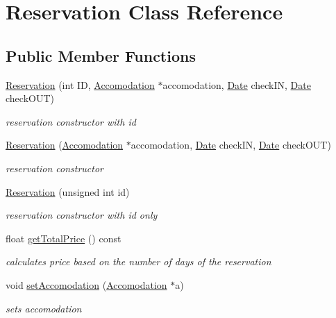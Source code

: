 \hypertarget{class_reservation}{}\section{Reservation Class Reference}
\label{class_reservation}
\subsection*{Public Member Functions}
\begin{DoxyCompactItemize}
\item 
\hyperlink{class_reservation_a51a68f9303eb59094dcf1e9e4615095b}{Reservation} (int ID, \hyperlink{class_accomodation}{Accomodation} $\ast$accomodation, \hyperlink{class_date}{Date} check\+IN, \hyperlink{class_date}{Date} check\+O\+UT)
\begin{DoxyCompactList}\small\item\em reservation constructor with id \end{DoxyCompactList}\item 
\hyperlink{class_reservation_a91855ef7aad415c89cbfaa7a40208d45}{Reservation} (\hyperlink{class_accomodation}{Accomodation} $\ast$accomodation, \hyperlink{class_date}{Date} check\+IN, \hyperlink{class_date}{Date} check\+O\+UT)
\begin{DoxyCompactList}\small\item\em reservation constructor \end{DoxyCompactList}\item 
\hyperlink{class_reservation_ad5e09723db6dd257c532d00d51aa9add}{Reservation} (unsigned int id)
\begin{DoxyCompactList}\small\item\em reservation constructor with id only \end{DoxyCompactList}\item 
\hypertarget{class_reservation_a31c13f5d56d55cfa7dd9de82160d48c5}{}\label{class_reservation_a31c13f5d56d55cfa7dd9de82160d48c5} 
float \hyperlink{class_reservation_a31c13f5d56d55cfa7dd9de82160d48c5}{get\+Total\+Price} () const
\begin{DoxyCompactList}\small\item\em calculates price based on the number of days of the reservation \end{DoxyCompactList}\item 
void \hyperlink{class_reservation_a17a9412b83e734b18692d007069e904e}{set\+Accomodation} (\hyperlink{class_accomodation}{Accomodation} $\ast$a)
\begin{DoxyCompactList}\small\item\em sets accomodation \end{DoxyCompactList}\item 

\end{DoxyCompactItemize}
